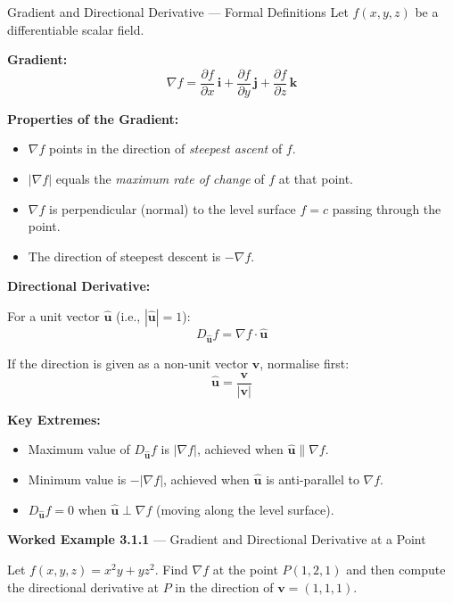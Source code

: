 \documentclass[12pt,a4paper]{article}
\begin{document}
\begin{infobox}{Gradient and Directional Derivative --- Formal Definitions}
Let $f(x,y,z)$ be a differentiable scalar field.

\textbf{Gradient:}
\[
  \nabla f = \frac{\partial f}{\partial x}\,\mathbf{i} + \frac{\partial f}{\partial y}\,\mathbf{j} + \frac{\partial f}{\partial z}\,\mathbf{k}
\]

\textbf{Properties of the Gradient:}
\begin{itemize}[leftmargin=*]
  \item $\nabla f$ points in the direction of \emph{steepest ascent} of $f$.
  \item $|\nabla f|$ equals the \emph{maximum rate of change} of $f$ at that point.
  \item $\nabla f$ is perpendicular (normal) to the level surface $f = c$ passing through the point.
  \item The direction of steepest descent is $-\nabla f$.
\end{itemize}

\textbf{Directional Derivative:}

For a unit vector $\hat{\mathbf{u}}$ (i.e., $|\hat{\mathbf{u}}| = 1$):
\[
  D_{\hat{\mathbf{u}}} f = \nabla f \cdot \hat{\mathbf{u}}
\]

If the direction is given as a non-unit vector $\mathbf{v}$, normalise first:
\[
  \hat{\mathbf{u}} = \frac{\mathbf{v}}{|\mathbf{v}|}
\]

\textbf{Key Extremes:}
\begin{itemize}[leftmargin=*]
  \item Maximum value of $D_{\hat{\mathbf{u}}} f$ is $|\nabla f|$, achieved when $\hat{\mathbf{u}} \parallel \nabla f$.
  \item Minimum value is $-|\nabla f|$, achieved when $\hat{\mathbf{u}}$ is anti-parallel to $\nabla f$.
  \item $D_{\hat{\mathbf{u}}} f = 0$ when $\hat{\mathbf{u}} \perp \nabla f$ (moving along the level surface).
\end{itemize}
\end{infobox}

\vspace{8pt}
\textbf{Worked Example 3.1.1} --- Gradient and Directional Derivative at a Point

Let $f(x,y,z) = x^2 y + yz^2$. Find $\nabla f$ at the point $P(1, 2, 1)$ and then compute the directional derivative at $P$ in the direction of $\mathbf{v} = (1, 1, 1)$.
\end{document}
